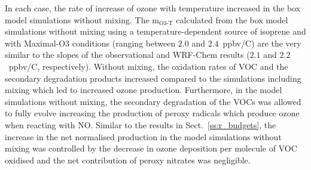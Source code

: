 In each case, the rate of increase of ozone with temperature increased in the box model simulations without mixing.
The m$_{\text{O3-T}}$ calculated from the box model simulations without mixing using a temperature-dependent source of isoprene and with Maximal-O3 conditions (ranging between $2.0$ and $2.4$~ppbv/\degree C) are the very similar to the slopes of the observational and WRF-Chem results ($2.1$ and $2.2$~ppbv/\degree C, respectively).
Without mixing, the oxidation rates of VOC and the secondary degradation products increased compared to the simulations including mixing which led to increased ozone production.
Furthermore, in the model simulations without mixing, the secondary degradation of the VOCs was allowed to fully evolve increasing the production of peroxy radicals which produce ozone when reacting with NO.
Similar to the results in Sect.~\ref{ss:r_budgets}, the increase in the net normalised  production in the model simulations without mixing was controlled by the decrease in ozone deposition per molecule of VOC oxidised and the net contribution of peroxy nitrates was negligible.
